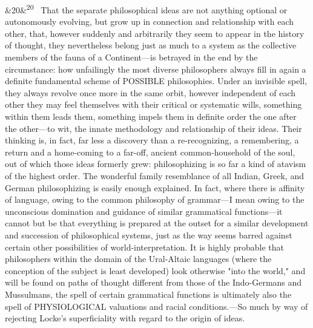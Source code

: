 \documentclass[12pt]{article}
\newcommand{\para}[1][]{\par\noindent\ifx&#1&\else\textsuperscript{\footnotesize #1}~\fi}
\begin{document}
\para[20] That the separate philosophical ideas are not anything optional or autonomously evolving, but grow up in connection and relationship with each other, that, however suddenly and arbitrarily they seem to appear in the history of thought, they nevertheless belong just as much to a system as the collective members of the fauna of a Continent---is betrayed in the end by the circumstance: how unfailingly the most diverse philosophers always fill in again a definite fundamental scheme of POSSIBLE philosophies. Under an invisible spell, they always revolve once more in the same orbit, however independent of each other they may feel themselves with their critical or systematic wills, something within them leads them, something impels them in definite order the one after the other---to wit, the innate methodology and relationship of their ideas. Their thinking is, in fact, far less a discovery than a re-recognizing, a remembering, a return and a home-coming to a far-off, ancient common-household of the soul, out of which those ideas formerly grew: philosophizing is so far a kind of atavism of the highest order. The wonderful family resemblance of all Indian, Greek, and German philosophizing is easily enough explained. In fact, where there is affinity of language, owing to the common philosophy of grammar---I mean owing to the unconscious domination and guidance of similar grammatical functions---it cannot but be that everything is prepared at the outset for a similar development and succession of philosophical systems, just as the way seems barred against certain other possibilities of world-interpretation. It is highly probable that philosophers within the domain of the Ural-Altaic languages (where the conception of the subject is least developed) look otherwise "into the world," and will be found on paths of thought different from those of the Indo-Germans and Mussulmans, the spell of certain grammatical functions is ultimately also the spell of PHYSIOLOGICAL valuations and racial conditions.---So much by way of rejecting Locke's superficiality with regard to the origin of ideas.
\end{document}
